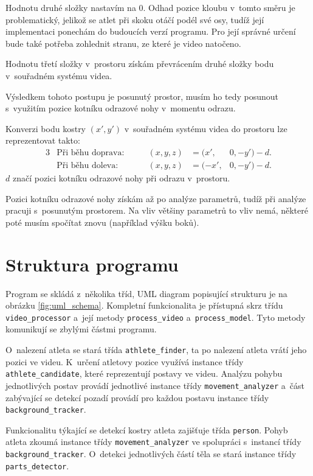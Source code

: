 Hodnotu druhé složky nastavím na $0$. Odhad pozice kloubu v~tomto směru je problematický, jelikož se atlet při skoku otáčí podél své osy, tudíž její implementaci ponechám do budoucích verzí programu. Pro její správné určení bude také potřeba zohlednit stranu, ze které je video natočeno.

Hodnotu třetí složky v~prostoru získám převrácením druhé složky bodu v~souřadném systému videa.

Výsledkem tohoto postupu je posunutý prostor, musím ho tedy posunout s~využitím pozice kotníku odrazové nohy v~momentu odrazu.

Konverzi bodu kostry $(x',y')$ v~souřadném systému videa do prostoru lze reprezentovat takto:
\begin{alignat*}{3}
    &\text{Při běhu doprava:} &\qquad (x,y,z)&=(x',&0,-y')-d. \\
    &\text{Při běhu doleva:} &\qquad (x,y,z)&=(-x',&0,-y')-d.
\end{alignat*}
$d$ značí pozici kotníku odrazové nohy při odrazu v~prostoru.

Pozici kotníku odrazové nohy získám až po analýze parametrů, tudíž při analýze pracuji s~posunutým prostorem. Na vliv většiny parametrů to vliv nemá, některé poté musím spočítat znovu (například výšku boků).




\section{Struktura programu}

Program se skládá z~několika tříd, UML diagram popisující strukturu je na obrázku \ref{fig:uml_schema}. Kompletní funkcionalita je přístupná skrz třídu \texttt{video\_processor} a~její metody \texttt{process\_video} a~\texttt{process\_model}. Tyto metody komunikují se zbylými částmi programu.

O~nalezení atleta se stará třída \texttt{athlete\_finder}, ta po nalezení atleta vrátí jeho pozici ve videu. K~určení atletovy pozice využívá instance třídy \texttt{athlete\_candidate}, které reprezentují postavy ve videu. Analýzu pohybu jednotlivých postav provádí jednotlivé instance třídy \texttt{movement\_analyzer} a~část zabývající se detekcí pozadí provádí pro každou postavu instance třídy \texttt{background\_tracker}.

Funkcionalitu týkající se detekcí kostry atleta zajišťuje třída \texttt{person}. Pohyb atleta zkoumá instance třídy \texttt{movement\_analyzer} ve spolupráci s~instancí třídy \texttt{background\_tracker}. O~detekci jednotlivých částí těla se stará instance třídy \texttt{parts\_detector}.

